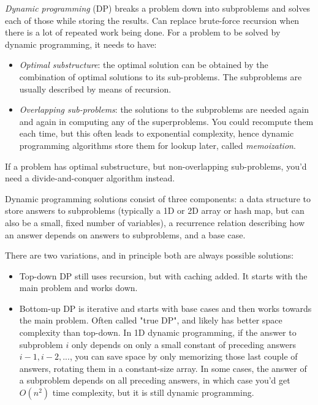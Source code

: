 \documentclass[table, xcdraw]{article}%
\begin{document}
\emph{Dynamic programming} (DP) breaks a problem down into subproblems and solves each of those while storing the results. Can replace brute-force recursion when there is a lot of repeated work being done. For a problem to be solved by dynamic programming, it needs to have:

\begin{itemize}
    \item \emph{Optimal substructure}: the optimal solution can be obtained by the combination of optimal solutions to its sub-problems. The subproblems are usually described by means of recursion.
    \item \emph{Overlapping sub-problems}: the solutions to the subproblems are needed again and again in computing any of the superproblems. You could recompute them each time, but this often leads to exponential complexity, hence dynamic programming algorithms store them for lookup later, called \emph{memoization}.
\end{itemize}

If a problem has optimal substructure, but non-overlapping sub-problems, you'd need a divide-and-conquer algorithm instead.

Dynamic programming solutions consist of three components: a data structure to store answers to subproblems (typically a 1D or 2D array or hash map, but can also be a small, fixed number of variables), a recurrence relation describing how an answer depends on answers to subproblems, and a base case.

There are two variations, and in principle both are always possible solutions:

\begin{itemize}
    \item Top-down DP still uses recursion, but with caching added. It starts with the main problem and works down.
    \item Bottom-up DP is iterative and starts with base cases and then works towards the main problem. Often called "true DP", and likely has better space complexity than top-down. In 1D dynamic programming, if the answer to subproblem $i$ only depends on only a small constant of preceding answers $i-1, i-2, ...$, you can save space by only memorizing those last couple of answers, rotating them in a constant-size array. In some cases, the answer of a subproblem depends on all preceding answers, in which case you'd get $O(n^2)$ time complexity, but it is still dynamic programming.
\end{itemize}
\end{document}
